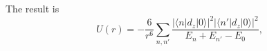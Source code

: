 The result is
\[
U(r)=-\frac6{r^6}\sum_{n,n'}\frac{|\langle n|d_z|0\rangle|^2|\langle n'|d_z|0\rangle|^2}{E_n+E_{n'}-E_0},
\]
